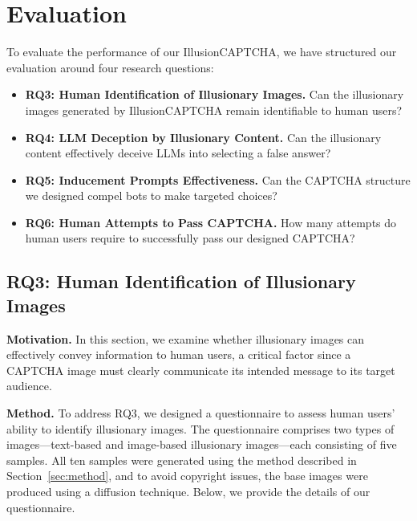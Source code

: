 \section{Evaluation}
To evaluate the performance of our IllusionCAPTCHA, we have structured our evaluation around four research questions:

\begin{itemize}[noitemsep,leftmargin=*] 
\item \textbf{RQ3: Human Identification of Illusionary Images.} Can the illusionary images generated by IllusionCAPTCHA remain identifiable to human users? 

\item \textbf{RQ4: LLM Deception by Illusionary Content.} Can the illusionary content effectively deceive LLMs into selecting a false answer? 

\item \textbf{RQ5: Inducement Prompts Effectiveness.} Can the CAPTCHA structure we designed compel bots to make targeted choices? 

\item \textbf{RQ6: Human Attempts to Pass CAPTCHA.} How many attempts do human users require to successfully pass our designed CAPTCHA? 
\end{itemize}






\subsection{RQ3: Human Identification of Illusionary Images}

\noindent\textbf{Motivation.} In this section, we examine whether illusionary images can effectively convey information to human users, a critical factor since a CAPTCHA image must clearly communicate its intended message to its target audience.

\noindent\textbf{Method.} To address RQ3, we designed a questionnaire to assess human users' ability to identify illusionary images. The questionnaire comprises two types of images—text-based and image-based illusionary images—each consisting of five samples. All ten samples were generated using the method described in Section~\ref{sec:method}, and to avoid copyright issues, the base images were produced using a diffusion technique. Below, we provide the details of our questionnaire.





